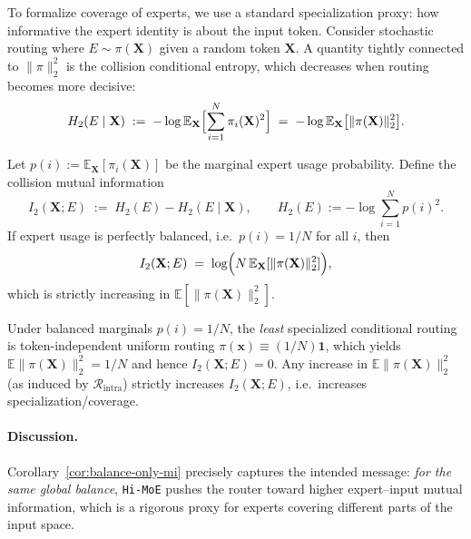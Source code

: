 \documentclass[sigconf,nonacm]{acmart}
\begin{document}
To formalize coverage of experts, we use a standard specialization proxy:
how informative the expert identity is about the input token.
Consider stochastic routing where $E\sim \pi(\mathbf{X})$ given a random token $\mathbf{X}$.
A quantity tightly connected to $\|\pi\|_2^2$ is the collision conditional entropy, which decreases when routing becomes more decisive:
\[
H_2(E\mid \mathbf{X})
\;:=\;
-\log \mathbb{E}_{\mathbf{X}}\Bigl[\sum_{i=1}^N \pi_i(\mathbf{X})^2\Bigr]
\;=\;
-\log \mathbb{E}_{\mathbf{X}}\bigl[\|\pi(\mathbf{X})\|_2^2\bigr].
\]

\begin{theorem}
\label{thm:main:renyi-mi}
Let $p(i):=\mathbb{E}_{\mathbf{X}}[\pi_i(\mathbf{X})]$ be the marginal expert usage probability.
Define the collision mutual information
\[
I_2(\mathbf{X};E)
\;:=\;
H_2(E) - H_2(E\mid \mathbf{X}),
\qquad
H_2(E):=-\log\sum_{i=1}^N p(i)^2.
\]
If expert usage is perfectly balanced, i.e.\ $p(i)=1/N$ for all $i$, then
\[
I_2(\mathbf{X};E)
\;=\;
\log\Bigl(N\,\mathbb{E}_{\mathbf{X}}[\|\pi(\mathbf{X})\|_2^2]\Bigr),
\]
which is strictly increasing in $\mathbb{E}[\|\pi(\mathbf{X})\|_2^2]$.
\end{theorem}
\begin{corollary}
\label{cor:balance-only-mi}
Under balanced marginals $p(i)=1/N$, the \emph{least} specialized conditional routing is token-independent uniform routing
$\pi(\mathbf{x})\equiv (1/N)\mathbf{1}$, which yields $\mathbb{E}\|\pi(\mathbf{X})\|_2^2 = 1/N$ and hence $I_2(\mathbf{X};E)=0$.
Any increase in $\mathbb{E}\|\pi(\mathbf{X})\|_2^2$ (as induced by $\mathcal{R}_{\text{intra}}$)
strictly increases $I_2(\mathbf{X};E)$, i.e.\ increases specialization/coverage.
\end{corollary}
\begin{tcolorbox}[colback=gray!0,colframe=gray!30,arc=2mm]
\paragraph{Discussion.}
Corollary~\ref{cor:balance-only-mi} precisely captures the intended message:
\emph{for the same global balance}, \texttt{Hi-MoE} pushes the router toward higher expert--input mutual information,
which is a rigorous proxy for experts covering different parts of the input space.
\end{tcolorbox}
\end{document}
